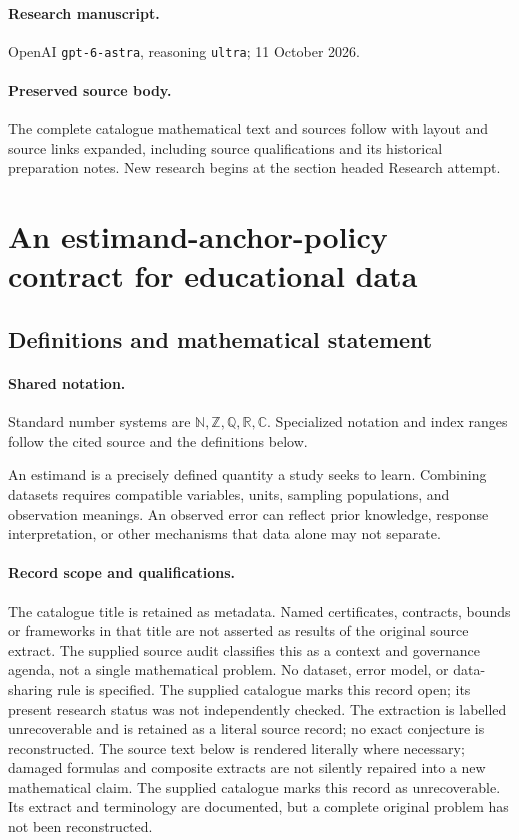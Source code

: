 \documentclass[11pt]{article}
\begin{document}
\paragraph{Research manuscript.} OpenAI \texttt{gpt-6-astra}, reasoning \texttt{ultra}; 11 October 2026.
\paragraph{Preserved source body.} The complete catalogue mathematical text and sources follow with layout and source links expanded, including source qualifications and its historical preparation notes. New research begins at the section headed Research attempt.

\section{An estimand-anchor-policy contract for educational data}\label{statement}

\subsection{Definitions and mathematical statement}

\paragraph{Shared notation.}Standard number systems are $\mathbb N,\mathbb Z,\mathbb Q,\mathbb R,\mathbb C$. Specialized notation and index ranges follow the cited source and the definitions below.


An estimand is a precisely defined quantity a study seeks to learn. Combining datasets requires compatible variables, units, sampling populations, and observation meanings. An observed error can reflect prior knowledge, response interpretation, or other mechanisms that data alone may not separate.
\paragraph{Record scope and qualifications.}
The catalogue title is retained as metadata. Named certificates, contracts, bounds or frameworks in that title are not asserted as results of the original source extract.
The supplied source audit classifies this as a context and governance agenda, not a single mathematical problem. No dataset, error model, or data-sharing rule is specified. The supplied catalogue marks this record open; its present research status was not independently checked. The extraction is labelled unrecoverable and is retained as a literal source record; no exact conjecture is reconstructed.
The source text below is rendered literally where necessary; damaged formulas and composite extracts are not silently repaired into a new mathematical claim.
The supplied catalogue marks this record as unrecoverable. Its extract and terminology are documented, but a complete original problem has not been reconstructed.
\end{document}
